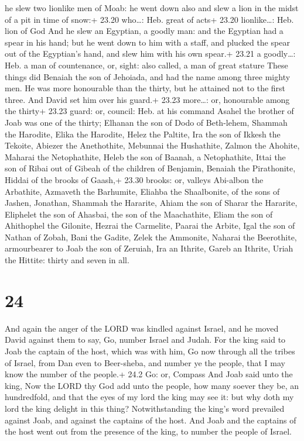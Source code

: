 he slew two lionlike men of Moab: he went down also and slew a lion in
the midst of a pit in time of snow:+ 23.20 who\ldots: Heb. great of
acts+ 23.20 lionlike\ldots: Heb. lion of God  And he slew
an Egyptian, a goodly man: and the Egyptian had a spear in his hand; but
he went down to him with a staff, and plucked the spear out of the
Egyptian's hand, and slew him with his own spear.+ 23.21 a goodly\ldots:
Heb. a man of countenance, or, sight: also called, a man of great
stature  These things did Benaiah the son of Jehoiada, and
had the name among three mighty men.  He was more
honourable than the thirty, but he attained not to the first three. And
David set him over his guard.+ 23.23 more\ldots: or, honourable among
the thirty+ 23.23 guard: or, council: Heb. at his command 
Asahel the brother of Joab was one of the thirty; Elhanan the son of
Dodo of Beth-lehem,  Shammah the Harodite, Elika the
Harodite,  Helez the Paltite, Ira the son of Ikkesh the
Tekoite,  Abiezer the Anethothite, Mebunnai the Hushathite,
 Zalmon the Ahohite, Maharai the Netophathite,
 Heleb the son of Baanah, a Netophathite, Ittai the son of
Ribai out of Gibeah of the children of Benjamin,  Benaiah
the Pirathonite, Hiddai of the brooks of Gaash,+ 23.30 brooks: or,
valleys  Abi-albon the Arbathite, Azmaveth the Barhumite,
 Eliahba the Shaalbonite, of the sons of Jashen, Jonathan,
 Shammah the Hararite, Ahiam the son of Sharar the
Hararite,  Eliphelet the son of Ahasbai, the son of the
Maachathite, Eliam the son of Ahithophel the Gilonite, 
Hezrai the Carmelite, Paarai the Arbite,  Igal the son of
Nathan of Zobah, Bani the Gadite,  Zelek the Ammonite,
Naharai the Beerothite, armourbearer to Joab the son of Zeruiah,
 Ira an Ithrite, Gareb an Ithrite,  Uriah the
Hittite: thirty and seven in all.

\hypertarget{section-23}{%
\section{24}\label{section-23}}

 And again the anger of the LORD was kindled against Israel,
and he moved David against them to say, Go, number Israel and Judah.
 For the king said to Joab the captain of the host, which
was with him, Go now through all the tribes of Israel, from Dan even to
Beer-sheba, and number ye the people, that I may know the number of the
people.+ 24.2 Go: or, Compass  And Joab said unto the king,
Now the LORD thy God add unto the people, how many soever they be, an
hundredfold, and that the eyes of my lord the king may see it: but why
doth my lord the king delight in this thing? 
Notwithstanding the king's word prevailed against Joab, and against the
captains of the host. And Joab and the captains of the host went out
from the presence of the king, to number the people of Israel.

